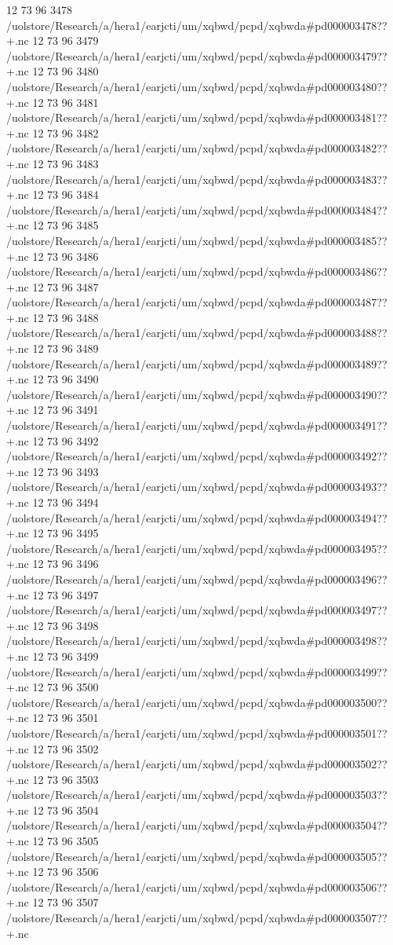12 73 96
3478
/uolstore/Research/a/hera1/earjcti/um/xqbwd/pcpd/xqbwda#pd000003478??+.nc
12 73 96
3479
/uolstore/Research/a/hera1/earjcti/um/xqbwd/pcpd/xqbwda#pd000003479??+.nc
12 73 96
3480
/uolstore/Research/a/hera1/earjcti/um/xqbwd/pcpd/xqbwda#pd000003480??+.nc
12 73 96
3481
/uolstore/Research/a/hera1/earjcti/um/xqbwd/pcpd/xqbwda#pd000003481??+.nc
12 73 96
3482
/uolstore/Research/a/hera1/earjcti/um/xqbwd/pcpd/xqbwda#pd000003482??+.nc
12 73 96
3483
/uolstore/Research/a/hera1/earjcti/um/xqbwd/pcpd/xqbwda#pd000003483??+.nc
12 73 96
3484
/uolstore/Research/a/hera1/earjcti/um/xqbwd/pcpd/xqbwda#pd000003484??+.nc
12 73 96
3485
/uolstore/Research/a/hera1/earjcti/um/xqbwd/pcpd/xqbwda#pd000003485??+.nc
12 73 96
3486
/uolstore/Research/a/hera1/earjcti/um/xqbwd/pcpd/xqbwda#pd000003486??+.nc
12 73 96
3487
/uolstore/Research/a/hera1/earjcti/um/xqbwd/pcpd/xqbwda#pd000003487??+.nc
12 73 96
3488
/uolstore/Research/a/hera1/earjcti/um/xqbwd/pcpd/xqbwda#pd000003488??+.nc
12 73 96
3489
/uolstore/Research/a/hera1/earjcti/um/xqbwd/pcpd/xqbwda#pd000003489??+.nc
12 73 96
3490
/uolstore/Research/a/hera1/earjcti/um/xqbwd/pcpd/xqbwda#pd000003490??+.nc
12 73 96
3491
/uolstore/Research/a/hera1/earjcti/um/xqbwd/pcpd/xqbwda#pd000003491??+.nc
12 73 96
3492
/uolstore/Research/a/hera1/earjcti/um/xqbwd/pcpd/xqbwda#pd000003492??+.nc
12 73 96
3493
/uolstore/Research/a/hera1/earjcti/um/xqbwd/pcpd/xqbwda#pd000003493??+.nc
12 73 96
3494
/uolstore/Research/a/hera1/earjcti/um/xqbwd/pcpd/xqbwda#pd000003494??+.nc
12 73 96
3495
/uolstore/Research/a/hera1/earjcti/um/xqbwd/pcpd/xqbwda#pd000003495??+.nc
12 73 96
3496
/uolstore/Research/a/hera1/earjcti/um/xqbwd/pcpd/xqbwda#pd000003496??+.nc
12 73 96
3497
/uolstore/Research/a/hera1/earjcti/um/xqbwd/pcpd/xqbwda#pd000003497??+.nc
12 73 96
3498
/uolstore/Research/a/hera1/earjcti/um/xqbwd/pcpd/xqbwda#pd000003498??+.nc
12 73 96
3499
/uolstore/Research/a/hera1/earjcti/um/xqbwd/pcpd/xqbwda#pd000003499??+.nc
12 73 96
3500
/uolstore/Research/a/hera1/earjcti/um/xqbwd/pcpd/xqbwda#pd000003500??+.nc
12 73 96
3501
/uolstore/Research/a/hera1/earjcti/um/xqbwd/pcpd/xqbwda#pd000003501??+.nc
12 73 96
3502
/uolstore/Research/a/hera1/earjcti/um/xqbwd/pcpd/xqbwda#pd000003502??+.nc
12 73 96
3503
/uolstore/Research/a/hera1/earjcti/um/xqbwd/pcpd/xqbwda#pd000003503??+.nc
12 73 96
3504
/uolstore/Research/a/hera1/earjcti/um/xqbwd/pcpd/xqbwda#pd000003504??+.nc
12 73 96
3505
/uolstore/Research/a/hera1/earjcti/um/xqbwd/pcpd/xqbwda#pd000003505??+.nc
12 73 96
3506
/uolstore/Research/a/hera1/earjcti/um/xqbwd/pcpd/xqbwda#pd000003506??+.nc
12 73 96
3507
/uolstore/Research/a/hera1/earjcti/um/xqbwd/pcpd/xqbwda#pd000003507??+.nc
